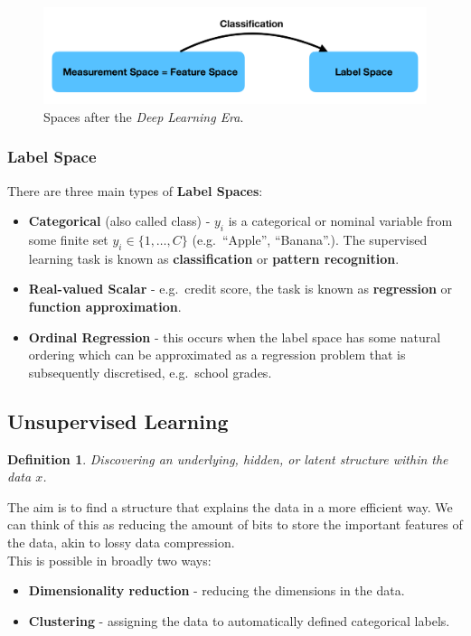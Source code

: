 \documentclass[11pt]{article}
\newtheorem{defn}{Definition}
\begin{document}
\begin{figure}[h]
  \caption{Spaces after the \textit{Deep Learning Era}.}
  \includegraphics[scale=0.2]{spacesafter}
  \centering
\end{figure}

\subsubsection{Label Space}
There are three main types of \textbf{Label Spaces}:
\begin{itemize}
  \item \textbf{Categorical} (also called class) - $y_i$ is a categorical or nominal variable from some finite set $y_i \in \{1, \ldots, C \}$ (e.g.\ ``Apple'', ``Banana''.).
    The supervised learning task is known as \textbf{classification} or \textbf{pattern recognition}.
  \item \textbf{Real-valued Scalar} - e.g.\ credit score, the task is known as \textbf{regression} or \textbf{function approximation}.
  \item \textbf{Ordinal Regression} - this occurs when the label space has some natural ordering which can be approximated as a regression problem that is subsequently discretised, e.g.\ school grades.
\end{itemize}

\subsection{Unsupervised Learning}
\begin{defn}
Discovering an underlying, hidden, or latent structure within the data $x$.
\end{defn}

The aim is to find a structure that explains the data in a more efficient way.
We can think of this as reducing the amount of bits to store the important features of the data, akin to lossy data compression. \\

This is possible in broadly two ways:
\begin{itemize}
  \item \textbf{Dimensionality reduction} - reducing the dimensions in the data.
  \item \textbf{Clustering} - assigning the data to automatically defined categorical labels.
\end{itemize}
\end{document}
